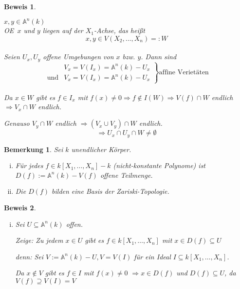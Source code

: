 \documentclass[a4paper, 12pt, numbers=noendperiod, chapterprefix=true, headsepline]{scrbook}
\theoremstyle{break}
\newtheorem{Bem}[Def]{Bemerkung}
\theoremstyle{nonumberbreak}
\newtheorem{Bew}{Beweis}
\theoremstyle{nonumberplain}
\newcommand{\A}{\mathbb{A}}
\renewcommand{\OE}{O\!\!E~}
\begin{document}
\begin{Bew}\begin{description}[\setlabelstyle{\normalfont}]
\item[$n=1$:] \checkmark
\item[{$n\ge 2$}:] $x,y \in \A ^n(k)$\\
	\OE $x$ und $y$ liegen auf der $X_1$-Achse, das hei\ss t \[x,y \in V(X_2,\dots ,X_n) =:W\]\\
	Seien $U_x,U_y$ offene Umgebungen von $x$ bzw. $y$. Dann sind\[\left.
		\begin{array}{rl}
		 & V_x=V(I_x) = \A ^n(k)-U_x\\
		 \textrm{und} & V_x=V(I_x) = \A ^n(k)-U_x
		\end{array}	\right\} \textrm{affine Veriet\"aten}\]\\
	Da $x\in W$ gibt es $f\in I_x$ mit $f(x) \neq 0 \Rightarrow f \notin I(W) \Rightarrow V(f)\cap W$ endlich $	\Rightarrow V_x \cap W$ endlich.
	
	Genauso $V_y \cap W$ endlich
	$\Rightarrow (V_x \cup V_y)\cap W$ endlich.
	\[\Rightarrow U_x \cap U_y \cap W \not= \emptyset\]
\end{description}\end{Bew}

\begin{Bem}\label{bem3.6}
Sei $k$ unendlicher K\"orper. \begin{enumerate}[i)]
\item
	F\"ur jedes $f \in k[X_1,\dots ,X_n]-k$ (nicht-konstante Polynome) ist $D(f):= \A ^n(k)-V(f)$ offene Teilmenge.
\item\label{bem3.6ii}
	Die $D(f)$ bilden eine Basis der Zariski-Topologie.
\end{enumerate}\end{Bem}

\begin{Bew}\begin{enumerate}[i)]
\item[ii)]
Sei $U \subseteq \A ^n(k)$ offen.

\emph{Zeige}: Zu jedem $x\in U$ gibt es $f\in k[X_1,\dots ,X_n]$ mit $x\in D(f) \subseteq U$

\emph{denn:} Sei $V:=\A ^n(k)-U, V=V(I)$ f\"ur ein Ideal $I \subseteq k[X_1,\dots ,X_n]$.

Da $x\notin V$ gibt es $f\in I$ mit $f(x) \not= 0$ $\Rightarrow x\in D(f)$ und $D(f) \subseteq U$, da $V(f) \supseteq V(I) =V$
\end{enumerate}\end{Bew}
\end{document}
